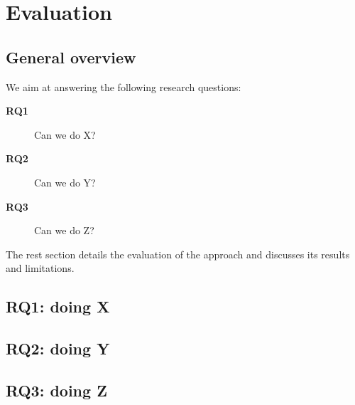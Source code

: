 \section{Evaluation}
\label{sec:evaluation}

\subsection{General overview}
\label{subsec:evaluation-general-overview}
We aim at answering the following research questions:
\begin{description}
    \item[\textbf{RQ1}] Can we do X?
    \item[\textbf{RQ2}] Can we do Y?
    \item[\textbf{RQ3}] Can we do Z?
\end{description}

The rest section details the evaluation of the approach and discusses its results and limitations.

\subsection{RQ1: doing X}
\label{subsec:evaluation-rq1}

\subsection{RQ2: doing Y}
\label{subsec:evaluation-rq2}

\subsection{RQ3: doing Z}
\label{subsec:evaluation-rq3}

